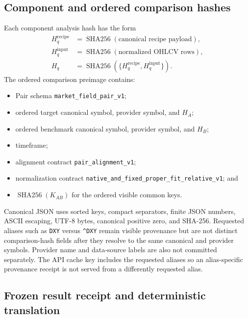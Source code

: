 \documentclass{article}
\newcommand{\sha}{\operatorname{SHA256}}
\begin{document}
\subsection{Component and ordered comparison hashes}

Each component analysis hash has the form
\begin{align}
H^{\mathrm{recipe}}_q
&=\sha(\text{canonical recipe payload}),\\
H^{\mathrm{input}}_q
&=\sha(\text{normalized OHLCV rows}),\\
H_q&=\sha\!\left(
\{H^{\mathrm{recipe}}_q,H^{\mathrm{input}}_q\}
\right).
\end{align}
The ordered comparison preimage contains:
\begin{itemize}
    \item Pair schema \texttt{market\_field\_pair\_v1};
    \item ordered target canonical symbol, provider symbol, and $H_A$;
    \item ordered benchmark canonical symbol, provider symbol, and $H_B$;
    \item timeframe;
    \item alignment contract \texttt{pair\_alignment\_v1};
    \item normalization contract \texttt{native\_and\_fixed\_proper\_fit\_relative\_v1}; and
    \item $\sha(K_{AB})$ for the ordered visible common keys.
\end{itemize}
Canonical JSON uses sorted keys, compact separators, finite JSON numbers, ASCII escaping, UTF-8 bytes, canonical positive zero, and SHA-256. Requested aliases such as \texttt{DXY} versus \texttt{\^{}DXY} remain visible provenance but are not distinct comparison-hash fields after they resolve to the same canonical and provider symbols. Provider name and data-source labels are also not committed separately. The API cache key includes the requested aliases so an alias-specific provenance receipt is not served from a differently requested alias.

\subsection{Frozen result receipt and deterministic translation}
\end{document}
